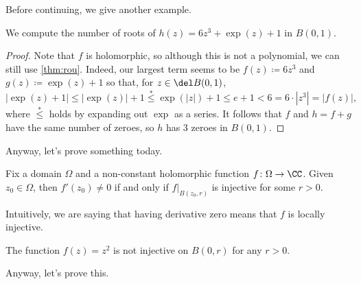 \documentclass[../notes.tex]{subfiles}
\begin{document}
Before continuing, we give another example.
\begin{exe}
	We compute the number of roots of $h(z)=6z^3+\exp(z)+1$ in $B(0,1)$.
\end{exe}
\begin{proof}
	Note that $f$ is holomorphic, so although this is not a polynomial, we can still use \autoref{thm:rou}. Indeed, our largest term seems to be $f(z)\coloneqq 6z^3$ and $g(z)\coloneqq \exp(z)+1$ so that, for $z\in\del B(0,1)$,
	\[|\exp(z)+1|\le|\exp(z)|+1\stackrel*\le\exp(|z|)+1\le e+1<6=6\cdot\left|z^3\right|=|f(z)|,\]
	where $\stackrel*\le$ holds by expanding out $\exp$ as a series. It follows that $f$ and $h=f+g$ have the same number of zeroes, so $h$ has $\boxed3$ zeroes in $B(0,1)$.
\end{proof}
Anyway, let's prove something today.
\begin{proposition} \label{prop:locallyinjective}
	Fix a domain $\Omega$ and a non-constant holomorphic function $f\colon \Omega\to\CC$. Given $z_0\in\Omega$, then $f'(z_0)\ne0$ if and only if $f|_{B(z_0,r)}$ is injective for some $r>0$.
\end{proposition}
Intuitively, we are saying that having derivative zero means that $f$ is locally injective.
\begin{ex}
	The function $f(z)=z^2$ is not injective on $B(0,r)$ for any $r>0$.
\end{ex}
Anyway, let's prove this.
\end{document}
